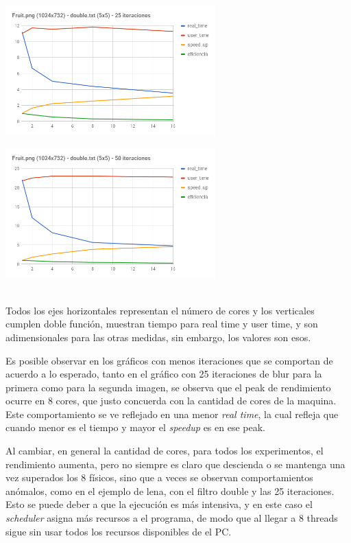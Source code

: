 \documentclass[letterpaper,10pt]{article}
\begin{document}
\begin{minipage}{0.5\linewidth}
\includegraphics[height=5cm]{chart__6_.png}
\end{minipage}
\begin{minipage}{0.5\linewidth}
\includegraphics[height=5cm]{chart__7_.png}
\end{minipage}
\\

Todos los ejes horizontales representan el número de cores y los verticales cumplen doble función, muestran tiempo para real time y user time, y son adimensionales para las otras medidas, sin embargo, los valores son esos.

Es posible observar en los gráficos con menos iteraciones que se comportan de acuerdo a lo esperado, tanto en el gráfico con 25 iteraciones de blur para la primera como para la segunda imagen, se observa que el peak de rendimiento ocurre en 8 cores, que justo concuerda con la cantidad de cores de la maquina. \\

Este comportamiento se ve reflejado en una menor \textit{real time}, la cual refleja que cuando menor es el tiempo y mayor el \textit{speedup} es en ese peak. 

Al cambiar, en general la cantidad de cores, para todos los experimentos, el rendimiento aumenta, pero no siempre es claro que descienda o se mantenga una vez superados los 8 físicos, sino que a veces se observan comportamientos anómalos, como en el ejemplo de lena, con el filtro double y las 25 iteraciones. Esto se puede deber a que la ejecución es más intensiva, y en este caso el \textit{scheduler} asigna más recursos a el programa, de modo que al llegar a 8 threads sigue sin usar todos los recursos disponibles de el PC.\\
\end{document}
